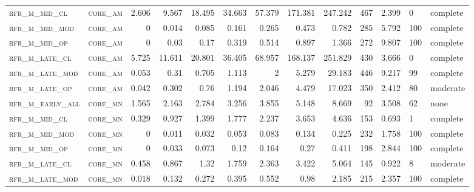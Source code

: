 \begin{landscape}
\begin{center}
\begin{longtable}{llrrrrr|rrr}
\textsc{rfr\_m\_mid\_cl   } & \textsc{core\_am  }   & 2.606   & 9.567   & 18.495  & 34.663   & 57.379   & 171.381  & 247.242  & 467    & 2.399         & 0             & complete           \\
\textsc{rfr\_m\_mid\_mod  } & \textsc{core\_am  }   & 0       & 0.014   & 0.085   & 0.161    & 0.265    & 0.473    & 0.782    & 285    & 5.792         & 100           & complete       \\
\textsc{rfr\_m\_mid\_op   } & \textsc{core\_am  }   & 0       & 0.03    & 0.17    & 0.319    & 0.514    & 0.897    & 1.366    & 272    & 9.807         & 100           & complete       \\
\textsc{rfr\_m\_late\_cl  } & \textsc{core\_am  }   & 5.725   & 11.611  & 20.801  & 36.405   & 68.957   & 168.137  & 251.829  & 430    & 3.666         & 0             & complete           \\
\textsc{rfr\_m\_late\_mod } & \textsc{core\_am  }   & 0.053   & 0.31    & 0.705   & 1.113    & 2        & 5.279    & 29.183   & 446    & 9.217         & 99            & complete       \\
\textsc{rfr\_m\_late\_op  } & \textsc{core\_am  }   & 0.042   & 0.302   & 0.76    & 1.194    & 2.046    & 4.479    & 17.023   & 350    & 2.412         & 80            & moderate       \\
\textsc{rfr\_m\_early\_all} & \textsc{core\_mn  }   & 1.565   & 2.163   & 2.784   & 3.256    & 3.855    & 5.148    & 8.669    & 92     & 3.508         & 62            & none       \\
\textsc{rfr\_m\_mid\_cl   } & \textsc{core\_mn  }   & 0.329   & 0.927   & 1.399   & 1.777    & 2.237    & 3.653    & 4.636    & 153    & 0.693         & 1             & complete       \\
\textsc{rfr\_m\_mid\_mod  } & \textsc{core\_mn  }   & 0       & 0.011   & 0.032   & 0.053    & 0.083    & 0.134    & 0.225    & 232    & 1.758         & 100           & complete       \\
\textsc{rfr\_m\_mid\_op   } & \textsc{core\_mn  }   & 0       & 0.033   & 0.073   & 0.12     & 0.164    & 0.27     & 0.411    & 198    & 2.844         & 100           & complete       \\
\textsc{rfr\_m\_late\_cl  } & \textsc{core\_mn  }   & 0.458   & 0.867   & 1.32    & 1.759    & 2.363    & 3.422    & 5.064    & 145    & 0.922         & 8             & moderate       \\
\textsc{rfr\_m\_late\_mod } & \textsc{core\_mn  }   & 0.018   & 0.132   & 0.272   & 0.395    & 0.552    & 0.98     & 2.185    & 215    & 2.357         & 100           & complete       \\

\end{longtable}
\end{center}
\end{landscape}
